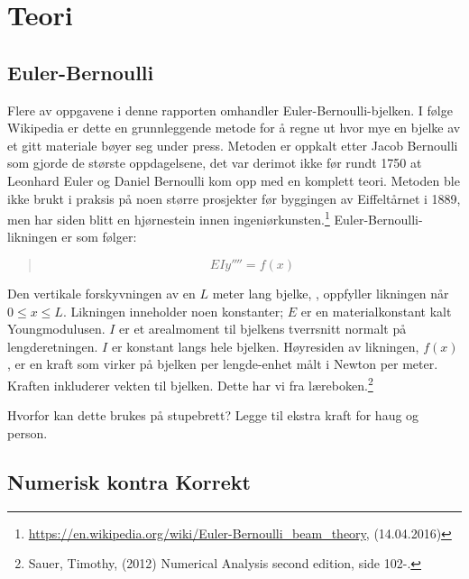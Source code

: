\section{Teori}

\subsection{Euler-Bernoulli}
Flere av oppgavene i denne rapporten omhandler Euler-Bernoulli-bjelken. I følge Wikipedia er dette en grunnleggende metode for å regne ut hvor mye en bjelke av et gitt materiale bøyer seg under press. Metoden er oppkalt etter Jacob Bernoulli som gjorde de største oppdagelsene, det var derimot ikke før rundt 1750 at Leonhard Euler og Daniel Bernoulli kom opp med en komplett teori. Metoden ble ikke brukt i praksis på noen større prosjekter før byggingen av Eiffeltårnet i 1889, men har siden blitt en hjørnestein innen ingeniørkunsten.\footnote{\url{https://en.wikipedia.org/wiki/Euler-Bernoulli_beam_theory}, (14.04.2016)} Euler-Bernoulli-likningen er som følger:
\begin{quote}
\begin{equation}
EIy''''=f(x)
\end{equation}
\end{quote}
Den vertikale forskyvningen av en $L$ meter lang bjelke, , oppfyller likningen når $0\leq x\leq L$. Likningen inneholder noen konstanter; $E$ er en materialkonstant kalt Youngmodulusen. $I$ er et arealmoment til bjelkens tverrsnitt normalt på lengderetningen. $I$ er konstant langs hele bjelken. Høyresiden av likningen, $f(x)$, er en kraft som virker på bjelken per lengde-enhet målt i Newton per meter. Kraften inkluderer vekten til bjelken. Dette har vi fra læreboken.\footnote{Sauer, Timothy, (2012) Numerical Analysis second edition, side 102-.}

Hvorfor kan dette brukes på stupebrett?
Legge til ekstra kraft for haug og person.

\subsection{Numerisk kontra Korrekt}

